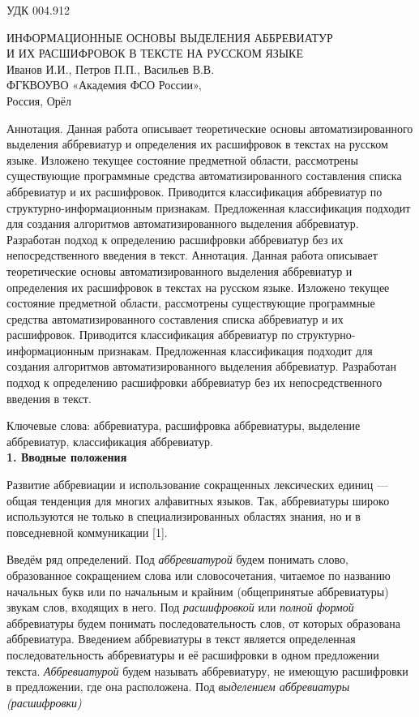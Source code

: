 \documentclass[12pt]{article}
\author{}
\date{}
\begin{document}
УДК 004.912

\begin{center}
    {{ИНФОРМАЦИОННЫЕ ОСНОВЫ ВЫДЕЛЕНИЯ АББРЕВИАТУР \\
    И ИХ РАСШИФРОВОК В ТЕКСТЕ НА РУССКОМ ЯЗЫКЕ} \\
    Иванов И.И., Петров П.П., Васильев В.В. \\
    ФГКВОУВО «Академия ФСО России», \\
    Россия, Орёл}
\end{center}

\noindent
\hspace{1.5em}Аннотация. Данная работа описывает теоретические основы автоматизированного выделения аббревиатур и определения их расшифровок в текстах на русском языке. Изложено текущее состояние предметной области, рассмотрены существующие программные средства автоматизированного составления списка аббревиатур и их расшифровок. Приводится классификация аббревиатур по структурно-информационным признакам. Предложенная классификация подходит для создания алгоритмов автоматизированного выделения аббревиатур. Разработан подход к определению расшифровки аббревиатур без их непосредственного введения в текст.
Аннотация. Данная работа описывает теоретические основы автоматизированного выделения аббревиатур и определения их расшифровок в текстах на русском языке. Изложено текущее состояние предметной области, рассмотрены существующие программные средства автоматизированного составления списка аббревиатур и их расшифровок. Приводится классификация аббревиатур по структурно-информационным признакам. Предложенная классификация подходит для создания алгоритмов автоматизированного выделения аббревиатур. Разработан подход к определению расшифровки аббревиатур без их непосредственного введения в текст.

Ключевые слова: аббревиатура, расшифровка аббревиатуры, выделение аббревиатур, классификация аббревиатур. \\

\textbf{1. Вводные положения}

\indent Развитие аббревиации и использование сокращенных лексических единиц — общая тенденция для многих алфавитных языков. Так, аббревиатуры широко используются не только в специализированных областях знания, но и в повседневной коммуникации [1].

\indent Введём ряд определений. Под \textit{аббревиатурой} будем понимать слово, образованное сокращением слова или словосочетания, читаемое по названию начальных букв или по начальным и крайним (общепринятые аббревиатуры) звукам слов, входящих в него. Под \textit{расшифровкой} или \textit{полной формой} аббревиатуры будем понимать последовательность слов, от которых образована аббревиатура. Введением аббревиатуры в текст является определенная последовательность аббревиатуры и её расшифровки в одном предложении текста. \textit{Аббревиатурой} будем называть аббревиатуру, не имеющую расшифровки в предложении, где она расположена. Под \textit{выделением аббревиатуры (расшифровки)}
\end{document}
